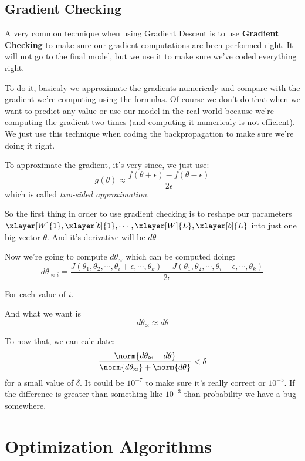 \documentclass[12pt, a4paper, oneside]{book}
\begin{document}
\subsection{Gradient Checking}%
\label{sub:gradient_checking}

A very common technique when using Gradient Descent is to use \textbf{Gradient
Checking} to make sure our gradient computations are been performed right. It
will not go to the final model, but we use it to make sure we've coded
everything right.

To do it, basicaly we approximate the gradients numericaly and compare with the
gradient we're computing using the formulas. Of course we don't do that when we
want to predict any value or use our model in the real world because we're
computing the gradient two times (and computing it numericaly is not efficient).
We just use this technique when coding the backpropagation to make sure we're
doing it right.

To approximate the gradient, it's very since, we just use:
\[
    g(\theta)\approx\dfrac{f(\theta+\epsilon)-f(\theta-\epsilon)}{2\epsilon}
\]
which is called \textit{two-sided approximation}.

So the first thing in order to use gradient checking is to reshape our
parameters $\xlayer[W]{1},\xlayer[b]{1},\cdots,\xlayer[W]{L},\xlayer[b]{L}$ into
just one big vector $\theta$. And it's derivative will be $d\theta$

Now we're going to compute $d\theta_{\approx}$ which can be computed
doing:
\[
    d\theta_{\approx i}=
    \dfrac{J(\theta_1,\theta_2,\cdots,\theta_i+\epsilon,\cdots,\theta_k)-
              J(\theta_1,\theta_2,\cdots,\theta_i-\epsilon,\cdots,\theta_k)}
              {2\epsilon}
\]

For each value of $i$.

And what we want is
\[
d\theta_{\approx}\approx d\theta
\]

To now that, we can calculate:
\[
    \dfrac{\norm{d\theta_{\approx}-d\theta}}
    {\norm{d\theta_{\approx}}+\norm{d\theta}} < \delta
\]
for a small value of $\delta$. It could be $10^{-7}$ to make sure it's really
correct or $10^{-5}$. If the difference is greater than something like $10^{-3}$
than probability we have a bug somewhere.

\section{Optimization Algorithms}%
\label{sec:optimization_algorithms}
\end{document}
